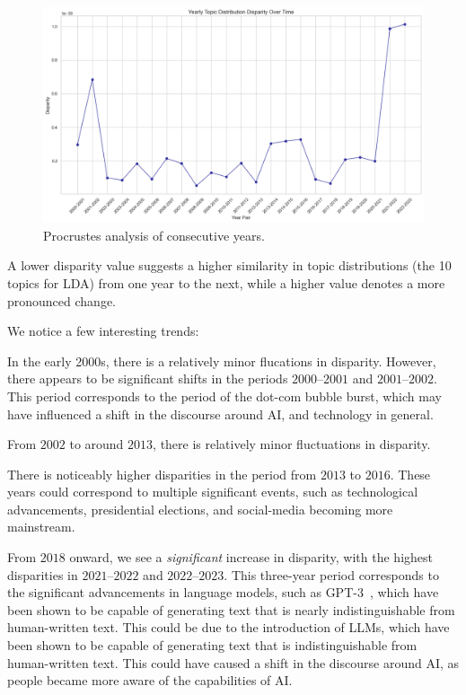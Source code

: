 \begin{figure}[H]
  \centering
  \includegraphics[width=\textwidth]{figures/procrustes/procrustes-consecutive.png}
  \caption{Procrustes analysis of consecutive years.}
  \label{fig:procrustes-consecutive}
\end{figure}

A lower disparity value suggests a higher similarity in topic distributions
(the 10 topics for LDA) from one year to the next, while a higher value denotes a more pronounced change.

We notice a few interesting trends:
\begin{enumroman}
  \item In the early 2000s, there is a relatively minor flucations in disparity.
    However, there appears to be significant shifts in the periods
    $2000$--$2001$ and $2001$--$2002$.
    This period corresponds to the period of the dot-com bubble burst, which may have influenced
    a shift in the discourse around AI, and technology in general.
  \item From $2002$ to around $2013$, there is relatively minor fluctuations in disparity.
  \item There is noticeably higher disparities in the period from $2013$ to $2016$.
    These years could correspond to multiple significant events, such as technological advancements,
    presidential elections, and social-media becoming more mainstream.
  \item From $2018$ onward, we see a \emph{significant} increase in disparity,
    with the highest disparities in $2021$--$2022$ and $2022$--$2023$.
    This three-year period corresponds to the significant advancements in
    language models, such as GPT-3~\cite{gpt3-paper},
    which have been shown to be capable of generating text that is nearly indistinguishable
    from human-written text.
    This could be due to the introduction of LLMs, which have been shown to be
    capable of generating text that is indistinguishable from human-written text.
    This could have caused a shift in the discourse around AI, as people
    became more aware of the capabilities of AI.
\end{enumroman}

